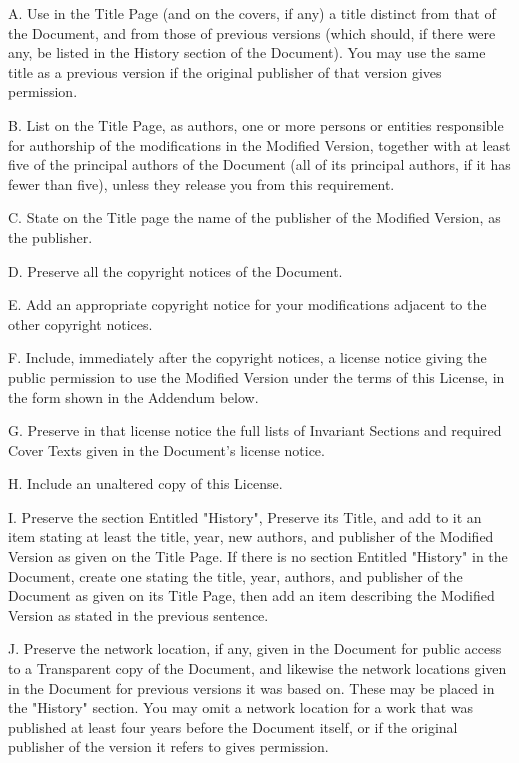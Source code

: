 \documentclass[a4paper,11pt]{report}
\begin{document}
{ A. Use in the Title Page (and on the covers, if any) a title distinct from
that of the Document, and from those of previous versions (which should, if
there were any, be listed in the History section of the Document). You may use
the same title as a previous version if the original publisher of that version
gives permission. 

 B. List on the Title Page, as authors, one or more persons or entities
responsible for authorship of the modifications in the Modified Version,
together with at least five of the principal authors of the Document (all of
its principal authors, if it has fewer than five), unless they release you
from this requirement. 

 C. State on the Title page the name of the publisher of the Modified Version,
as the publisher. 

 D. Preserve all the copyright notices of the Document. 

 E. Add an appropriate copyright notice for your modifications adjacent to the
other copyright notices. 

 F. Include, immediately after the copyright notices, a license notice giving
the public permission to use the Modified Version under the terms of this
License, in the form shown in the Addendum below. 

 G. Preserve in that license notice the full lists of Invariant Sections and
required Cover Texts given in the Document's license notice. 

 H. Include an unaltered copy of this License. 

 I. Preserve the section Entitled "History", Preserve its Title, and add to it
an item stating at least the title, year, new authors, and publisher of the
Modified Version as given on the Title Page. If there is no section Entitled
"History" in the Document, create one stating the title, year, authors, and
publisher of the Document as given on its Title Page, then add an item
describing the Modified Version as stated in the previous sentence. 

 J. Preserve the network location, if any, given in the Document for public
access to a Transparent copy of the Document, and likewise the network
locations given in the Document for previous versions it was based on. These
may be placed in the "History" section. You may omit a network location for a
work that was published at least four years before the Document itself, or if
the original publisher of the version it refers to gives permission. 

}
\end{document}
